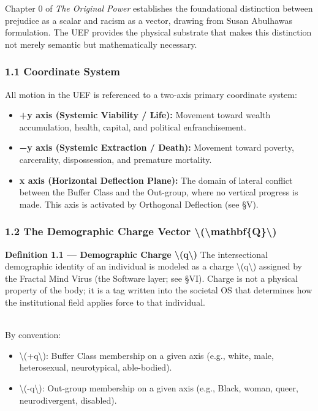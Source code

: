 Chapter 0 of \emph{The Original Power} establishes the
foundational distinction between prejudice as a scalar and racism as a
vector, drawing from Susan Abulhawa\textquotesingle s formulation. The
UEF provides the physical substrate that makes this distinction not
merely semantic but mathematically necessary.

\subsubsection{1.1 Coordinate System}\label{coordinate-system}

All motion in the UEF is referenced to a two-axis primary coordinate
system:

\begin{itemize}
\tightlist
\item
  \textbf{+y axis (Systemic Viability / Life):} Movement toward wealth
  accumulation, health, capital, and political enfranchisement.
\item
  \textbf{−y axis (Systemic Extraction / Death):} Movement toward
  poverty, carcerality, dispossession, and premature mortality.
\item
  \textbf{x axis (Horizontal Deflection Plane):} The domain of lateral
  conflict between the Buffer Class and the Out-group, where no vertical
  progress is made. This axis is activated by Orthogonal Deflection (see
  §V).
\end{itemize}

\subsubsection{1.2 The Demographic Charge Vector
\textbackslash(\textbackslash mathbf\{Q\}\textbackslash)}\label{the-demographic-charge-vector-mathbfq}

\textbf{Definition 1.1 --- Demographic Charge
\textbackslash(q\textbackslash)} The intersectional demographic identity
of an individual is modeled as a charge \textbackslash(q\textbackslash)
assigned by the Fractal Mind Virus (the Software layer; see §VI). Charge
is not a physical property of the body; it is a tag written into the
societal OS that determines how the institutional field applies force to
that individual.\\
\strut \\
By convention:

\begin{itemize}
\tightlist
\item
  \textbackslash(+q\textbackslash): Buffer Class membership on a given
  axis (e.g., white, male, heterosexual, neurotypical, able-bodied).
\item
  \textbackslash(-q\textbackslash): Out-group membership on a given axis
  (e.g., Black, woman, queer, neurodivergent, disabled).
\end{itemize}

